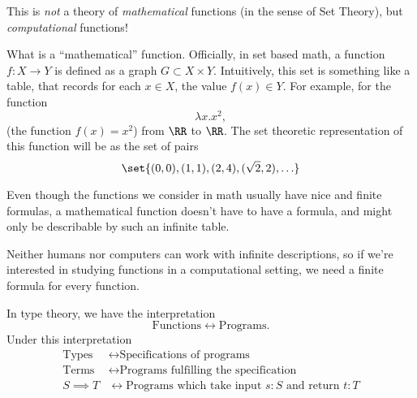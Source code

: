 \documentclass{article}
\begin{document}
This is \emph{not} a theory of \emph{mathematical} 
functions (in the sense of Set Theory), but \emph{computational}
functions!

What is a ``mathematical'' function. Officially, in
set based math, a function $f:X\to Y$ is defined as a graph 
$G\subset X\times Y$. Intuitively, this set is something
like a table, that records for each $x\in X$, the value
$f(x)\in Y$. For example, for the function
\[ \lambda x.x^2, \]
(the function $f(x)=x^2$) from $\RR$ to $\RR$.
The set theoretic representation of this function will be
as the set of 
pairs \[ \set{(0,0),(1,1),(2,4),(\sqrt{2},2),\ldots}\]

Even though the functions we consider in math usually have
nice and finite formulas, a mathematical function doesn't
have to have a formula, and might only be describable by 
such an infinite table.

Neither humans nor computers can work with infinite descriptions,
so if we're interested in studying functions in a computational
setting, we need a finite formula for every function.

In type theory, we have the interpretation
\[ \text{Functions} \longleftrightarrow \text{Programs}. \]
Under this interpretation
\begin{align*}
     \text{Types}& \longleftrightarrow 
\text{Specifications of programs}\\
\text{Terms} &\longleftrightarrow 
\text{Programs fulfilling the specification}\\
 S\implies T &\longleftrightarrow 
\text{Programs which take input $s:S$ and return $t:T$}
\end{align*}
\end{document}
